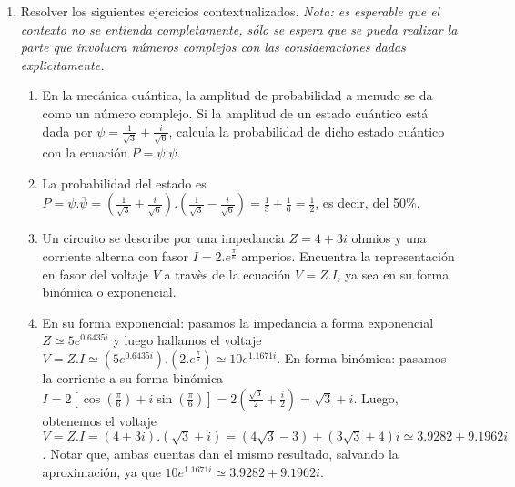 \documentclass[a4paper]{article}
\newcommand{\answer}{\item[**]}
\newcommand{\exercise}{\item}
\newcommand{\df}[2]{\displaystyle\frac{#1}{#2}}
\newcommand{\conj}[1]{\overline{#1}}
\newcommand{\cis}[1]{\left[\cos\left({#1}\right)+i\sin\left({#1}\right)\right]}
\begin{document}
\begin{enumerate}
\begin{enumerate} [label=(\alph*)]
		\item Rotar el complejo $z=3+i$ para que pertenezca a la región $\{ z \in \mathbb{C} ~/~ |z+3| \leq 1 \}$. Graficar.
		\answer Notar que $Arg(3+i) \simeq 18.43^{\circ}$ y queremos rotarlo para que esté orientado hace el eje $-x$, por lo que deberíamos rotarlo alrededor de $160^{\circ}=\df{8}{9}\pi$ (no hace falta ser exactos ya que hay toda un área donde el complejo puede caer). Para rotarlo debemos hacer la operación $w=z.e^{\frac{8\pi}{9}i}\simeq \left(\sqrt{10}e^{0.3218 i}\right).e^{\frac{8\pi}{9}i}\simeq \sqrt{10}e^{3.1143 i} \simeq -3.1611 + 0.0864 i$, que gráficamente puede verse que comprueba lo pedido.


	\end{enumerate}

	\exercise Resolver los siguientes ejercicios contextualizados. \textit{Nota: es esperable que el contexto no se entienda completamente, sólo se espera que se pueda realizar la parte que involucra números complejos con las consideraciones dadas explicitamente.}
	\begin{enumerate} [label=(\alph*)]
		
		\item En la mecánica cuántica, la amplitud de probabilidad a menudo se da como un número complejo. Si la amplitud de un estado cuántico está dada por $\psi=\df{1}{\sqrt{3}}+\df{i}{\sqrt{6}}$, calcula la probabilidad de dicho estado cuántico con la ecuación $P=\psi .\conj{\psi}$.
		\answer La probabilidad del estado es $P=\psi .\conj{\psi}=\left(\df{1}{\sqrt{3}}+\df{i}{\sqrt{6}}\right).\left(\df{1}{\sqrt{3}}-\df{i}{\sqrt{6}}\right)=\df{1}{3}+\df{1}{6}=\df{1}{2}$, es decir, del 50\%.

		\item Un circuito se describe por una impedancia $Z=4+3i$ ohmios y una corriente alterna con fasor $I=2.e^{\frac{\pi}{6}}$ amperios. Encuentra la representación en fasor del voltaje  $V$ a travès de la ecuación $V=Z.I$, ya sea en su forma binómica o exponencial.
		\answer En su forma exponencial: pasamos la impedancia a forma exponencial $Z \simeq 5e^{0.6435 i}$ y luego hallamos el voltaje $V=Z.I\simeq\left(5e^{0.6435 i}\right).\left(2.e^{\frac{\pi}{6}}\right)\simeq10e^{1.1671 i}$. En forma binómica: pasamos la corriente a su forma binómica $I=2\cis{\df{\pi}{6}}=2\left(\df{\sqrt{3}}{2}+\df{i}{2}\right)=\sqrt{3}+i$. Luego, obtenemos el voltaje $V=Z.I=(4+3i).(\sqrt{3}+i)=(4\sqrt{3}-3)+(3\sqrt{3}+4)i\simeq 3.9282 + 9.1962 i$. Notar que, ambas cuentas dan el mismo resultado, salvando la aproximación, ya que $10e^{1.1671 i} \simeq 3.9282 + 9.1962 i$.


\end{enumerate}
\end{enumerate}
\end{document}
